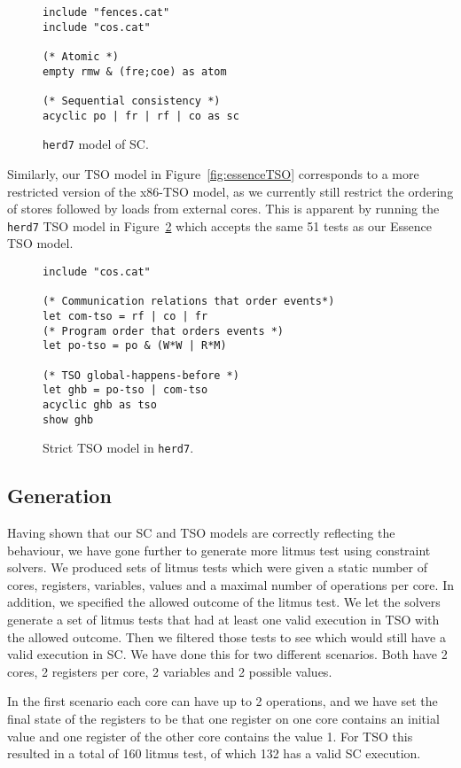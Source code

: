 \documentclass[runningheads]{llncs}
\begin{document}
\begin{figure}
\begin{lstlisting}
include "fences.cat"
include "cos.cat"

(* Atomic *)
empty rmw & (fre;coe) as atom

(* Sequential consistency *)
acyclic po | fr | rf | co as sc
\end{lstlisting}
\caption{{\tt{herd7}} model of SC.\label{fig:herdSC}}
\end{figure}


Similarly, our TSO model in Figure~\ref{fig:essenceTSO} corresponds to a more restricted version of the x86-TSO model, as we currently still restrict the ordering of stores followed by loads from external cores.
This is apparent by running the {\tt{herd7}} TSO model in Figure~\ref{fig:herdTSO} which accepts the same 51 tests as our Essence TSO model.
\begin{figure}
\begin{lstlisting}
include "cos.cat"

(* Communication relations that order events*)
let com-tso = rf | co | fr
(* Program order that orders events *)
let po-tso = po & (W*W | R*M)

(* TSO global-happens-before *)
let ghb = po-tso | com-tso
acyclic ghb as tso
show ghb
\end{lstlisting}
\caption{Strict TSO model in {\tt{herd7}}.\label{fig:herdTSO}}
\end{figure}



\subsection{Generation}
Having shown that our SC and TSO models are correctly reflecting the behaviour, we have gone further to generate more litmus test using constraint solvers.
We produced sets of litmus tests which were given a static number of cores, registers, variables, values and a maximal number of operations per core.
In addition, we specified the allowed outcome of the litmus test.
We let the solvers generate a set of litmus tests that had at least one valid execution in TSO with the allowed outcome.
Then we filtered those tests to see which would still have a valid execution in SC.
We have done this for two different scenarios.
Both have 2 cores, 2 registers per core, 2 variables and 2 possible values.

In the first scenario each core can have up to 2 operations, and we have set the final state of the registers to be that one register on one core contains an initial value and one register of the other core contains the value 1.
For TSO this resulted in a total of 160 litmus test, of which 132 has a valid SC execution.
\end{document}
